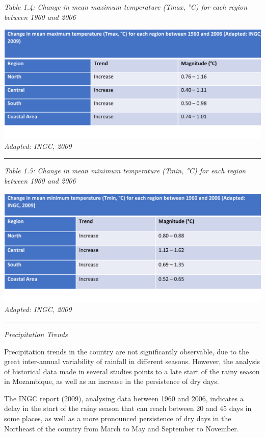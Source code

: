 \documentclass[
]{book}
\begin{document}
\emph{Table 1.4: Change in mean maximum temperature (Tmax, °C) for each region between 1960 and 2006}

\includegraphics{Temperature-max.png}
\emph{Adapted: INGC, 2009}

\begin{center}\rule{0.5\linewidth}{0.5pt}\end{center}

\emph{Table 1.5: Change in mean minimum temperature (Tmin, °C) for each region between 1960 and 2006}

\includegraphics{Temperature-min.png}
\emph{Adapted: INGC, 2009}

\begin{center}\rule{0.5\linewidth}{0.5pt}\end{center}

\emph{Precipitation Trends}

Precipitation trends in the country are not significantly observable, due to the great inter-annual variability of rainfall in different seasons. However, the analysis of historical data made in several studies points to a late start of the rainy season in Mozambique, as well as an increase in the persistence of dry days.

The INGC report (2009), analysing data between 1960 and 2006, indicates a delay in the start of the rainy season that can reach between 20 and 45 days in some places, as well as a more pronounced persistence of dry days in the Northeast of the country from March to May and September to November.
\end{document}
